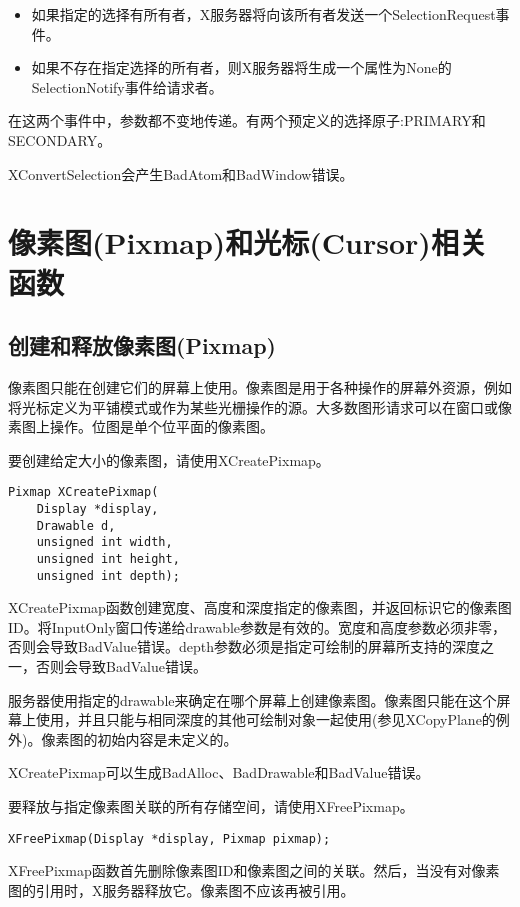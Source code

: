 \begin{itemize}
	\item 如果指定的选择有所有者，X服务器将向该所有者发送一个SelectionRequest事件。
	\item 如果不存在指定选择的所有者，则X服务器将生成一个属性为None的SelectionNotify事件给请求者。
\end{itemize}

在这两个事件中，参数都不变地传递。有两个预定义的选择原子:PRIMARY和SECONDARY。

XConvertSelection会产生BadAtom和BadWindow错误。

\section{像素图(Pixmap)和光标(Cursor)相关函数}

\subsection{创建和释放像素图(Pixmap)}

像素图只能在创建它们的屏幕上使用。像素图是用于各种操作的屏幕外资源，例如将光标定义为平铺模式或作为某些光栅操作的源。大多数图形请求可以在窗口或像素图上操作。位图是单个位平面的像素图。

要创建给定大小的像素图，请使用XCreatePixmap。

\begin{lstlisting}
Pixmap XCreatePixmap(
	Display *display,
	Drawable d,
	unsigned int width,
	unsigned int height,
	unsigned int depth);
\end{lstlisting}

XCreatePixmap函数创建宽度、高度和深度指定的像素图，并返回标识它的像素图ID。将InputOnly窗口传递给drawable参数是有效的。宽度和高度参数必须非零，否则会导致BadValue错误。depth参数必须是指定可绘制的屏幕所支持的深度之一，否则会导致BadValue错误。

服务器使用指定的drawable来确定在哪个屏幕上创建像素图。像素图只能在这个屏幕上使用，并且只能与相同深度的其他可绘制对象一起使用(参见XCopyPlane的例外)。像素图的初始内容是未定义的。

XCreatePixmap可以生成BadAlloc、BadDrawable和BadValue错误。

要释放与指定像素图关联的所有存储空间，请使用XFreePixmap。
\begin{lstlisting}
XFreePixmap(Display *display, Pixmap pixmap);
\end{lstlisting}

XFreePixmap函数首先删除像素图ID和像素图之间的关联。然后，当没有对像素图的引用时，X服务器释放它。像素图不应该再被引用。

